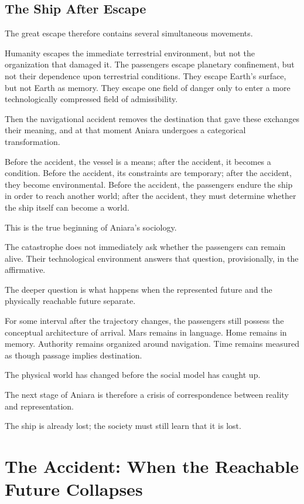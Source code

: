 \documentclass[11pt,oneside]{book}
\theoremstyle{definition}
\theoremstyle{remark}
\begin{document}
\section{The Ship After Escape}

The great escape therefore contains several simultaneous movements.

Humanity escapes the immediate terrestrial environment, but not the organization that damaged it. The passengers escape planetary confinement, but not their dependence upon terrestrial conditions. They escape Earth's surface, but not Earth as memory. They escape one field of danger only to enter a more technologically compressed field of admissibility.

Then the navigational accident removes the destination that gave these exchanges their meaning, and at that moment Aniara undergoes a categorical transformation.

Before the accident, the vessel is a means; after the accident, it becomes a condition. Before the accident, its constraints are temporary; after the accident, they become environmental. Before the accident, the passengers endure the ship in order to reach another world; after the accident, they must determine whether the ship itself can become a world.

This is the true beginning of Aniara's sociology.

The catastrophe does not immediately ask whether the passengers can remain alive. Their technological environment answers that question, provisionally, in the affirmative.

The deeper question is what happens when the represented future and the physically reachable future separate.

For some interval after the trajectory changes, the passengers still possess the conceptual architecture of arrival. Mars remains in language. Home remains in memory. Authority remains organized around navigation. Time remains measured as though passage implies destination.

The physical world has changed before the social model has caught up.

The next stage of Aniara is therefore a crisis of correspondence between reality and representation.

The ship is already lost; the society must still learn that it is lost.

\chapter{The Accident: When the Reachable Future Collapses}
\end{document}
